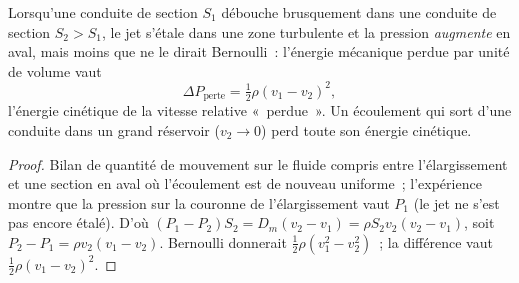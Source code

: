 \begin{proposition}\label{prop:b2:flow-balances:borda}
Lorsqu'une conduite de section $S_1$ débouche brusquement dans une conduite de section $S_2
> S_1$, le jet s'étale dans une zone turbulente et la pression
\emph{augmente} en aval, mais moins que ne le dirait Bernoulli~: l'énergie
mécanique perdue par unité de volume vaut
\[
\Delta P_{\text{perte}} = \tfrac12\rho(v_1 - v_2)^2 ,
\]
l'énergie cinétique de la vitesse relative «~perdue~». Un écoulement qui sort d'une
conduite dans un grand réservoir ($v_2 \to 0$) perd toute son énergie cinétique.
\end{proposition}

\begin{proof}
Bilan de quantité de mouvement sur le fluide compris entre l'élargissement et une section
en aval où l'écoulement est de nouveau uniforme~; l'expérience montre que la
pression sur la couronne de l'élargissement vaut $P_1$ (le jet ne s'est
pas encore étalé). D'où $(P_1 - P_2)S_2 = D_m(v_2 - v_1) = \rho S_2v_2(v_2 -
v_1)$, soit $P_2 - P_1 = \rho v_2(v_1 - v_2)$. Bernoulli donnerait
$\tfrac12\rho(v_1^2 - v_2^2)$~; la différence vaut $\tfrac12\rho(v_1 - v_2)^2$.
\end{proof}

